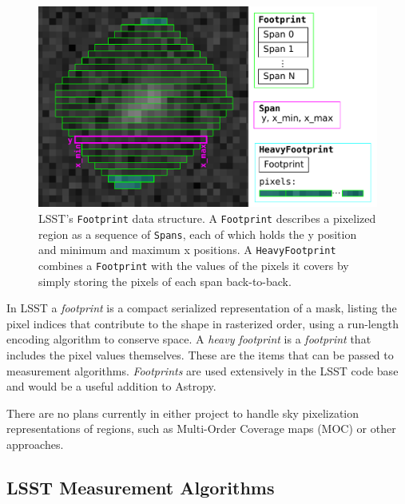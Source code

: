\documentclass[]{spie}  %
\begin{document}
\begin{figure} [t]
\begin{center}
\includegraphics[width=\textwidth]{footprint}
\end{center}
\caption[footprint]
{\label{fig:footprint}
LSST's \texttt{Footprint} data structure.
A \texttt{Footprint} describes a pixelized region as a sequence of \texttt{Spans}, each of which holds the y position and minimum and maximum x positions.  A \texttt{HeavyFootprint} combines a \texttt{Footprint} with the values of the pixels it covers by simply storing the pixels of each span back-to-back.}
\end{figure}

In LSST a \emph{footprint} is a compact serialized representation of a mask, listing the pixel indices that contribute to the shape in rasterized order, using a run-length encoding algorithm to conserve space.
A \emph{heavy footprint} is a \emph{footprint} that includes the pixel values themselves.
These are the items that can be passed to measurement algorithms.
\emph{Footprints} are used extensively in the LSST code base and would be a useful addition to Astropy.

There are no plans currently in either project to handle sky pixelization representations of regions, such as Multi-Order Coverage maps (MOC)\cite{2012ASPC..461..347F,2014ivoa.spec.0602F} or other approaches\cite{2015A&A...580A.132R}.

\subsection{LSST Measurement Algorithms}
\end{document}
